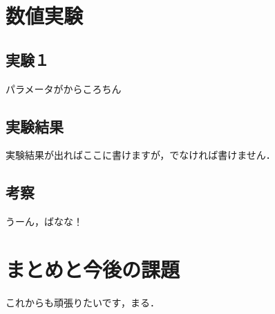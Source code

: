 \documentclass[twocolumn]{jarticle}
\begin{document}
\section{数値実験}
  \subsection{実験１}
  パラメータがからころちん

  \subsection{実験結果}
  実験結果が出ればここに書けますが，でなければ書けません．

  \subsection{考察}
  うーん，ばなな！

\section{まとめと今後の課題}
これからも頑張りたいです，まる．




\end{document}
